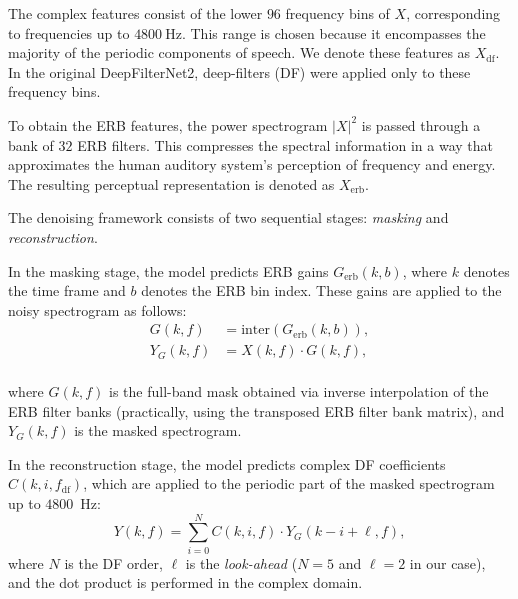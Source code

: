 \documentclass[final,5p,times,authoryear]{elsarticle}
\begin{document}
The complex features consist of the lower $96$ frequency bins of $X$, corresponding to frequencies up to $4800~\text{Hz}$. This range is chosen because it encompasses the majority of the periodic components of speech. We denote these features as $X_{\mathrm{df}}$. In the original DeepFilterNet2, deep-filters (DF) were applied only to these frequency bins.

To obtain the ERB features, the power spectrogram $|X|^2$ is passed through a bank of $32$ ERB filters. This compresses the spectral information in a way that approximates the human auditory system's perception of frequency and energy. The resulting perceptual representation is denoted as $X_{\mathrm{erb}}$.

The denoising framework consists of two sequential stages: \emph{masking} and \emph{reconstruction}.

In the masking stage, the model predicts ERB gains $G_{\mathrm{erb}}(k,b)$, where $k$ denotes the time frame and $b$ denotes the ERB bin index. These gains are applied to the noisy spectrogram as follows:
\\
\begin{equation}
\begin{aligned}
    G(k, f) &= \mathrm{inter}\!\left(G_{\mathrm{erb}}(k, b)\right), \\
    Y_G(k, f) &= X(k, f) \cdot G(k, f),
\end{aligned}
\end{equation}
\\
where $G(k,f)$ is the full-band mask obtained via inverse interpolation of the ERB filter banks (practically, using the transposed ERB filter bank matrix), and $Y_G(k,f)$ is the masked spectrogram.

In the reconstruction stage, the model predicts complex DF coefficients $C(k, i, f_{\mathrm{df}})$, which are applied to the periodic part of the masked spectrogram up to $4800$~Hz:
\begin{equation}
    Y(k, f) = \sum_{i=0}^{N} C(k, i, f) \cdot Y_G(k - i + \ell, f),
\end{equation}
where $N$ is the DF order, $\ell$ is the \emph{look-ahead} ($N=5$ and $\ell=2$ in our case), and the dot product is performed in the complex domain.
\end{document}
